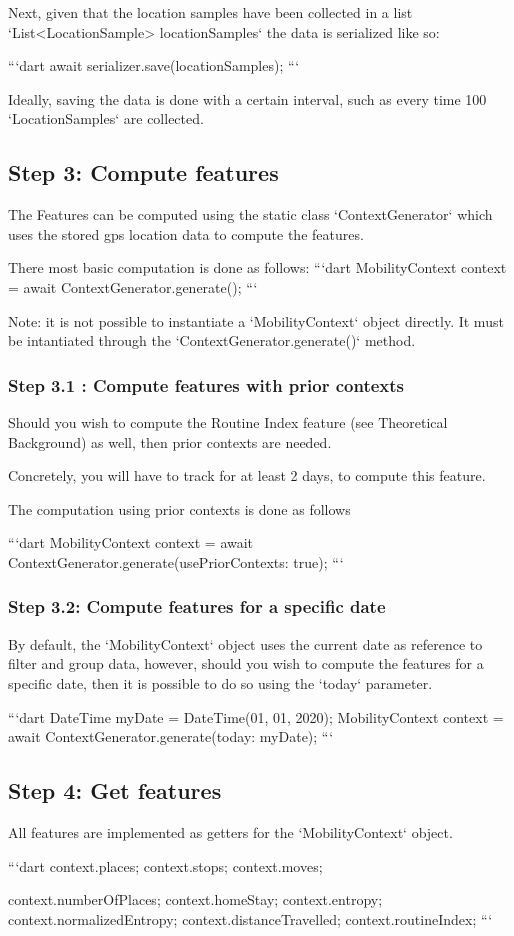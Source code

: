 Next, given that the location samples have been collected in a list `List<LocationSample> locationSamples` the data is serialized like so:

```dart
await serializer.save(locationSamples);
```

Ideally, saving the data is done with a certain interval, such as every time 100 `LocationSamples` are collected. 

\subsection*{Step 3: Compute features}
The Features can be computed using the static class `ContextGenerator` which uses the stored gps location data to compute the features.

There most basic computation is done as follows:
```dart
MobilityContext context = await ContextGenerator.generate();
```

Note: it is not possible to instantiate a `MobilityContext` object directly. 
It must be intantiated through the `ContextGenerator.generate()` method.

\subsubsection*{Step 3.1 : Compute features with prior contexts}
Should you wish to compute the Routine Index feature (see Theoretical Background) as well, then prior contexts are needed. 

Concretely, you will have to track for at least 2 days, to compute this feature.

The computation using prior contexts is done as follows

```dart
MobilityContext context = await ContextGenerator.generate(usePriorContexts: true);
```

\subsubsection*{Step 3.2: Compute features for a specific date}
By default, the `MobilityContext` object uses the current date as reference to filter 
and group data, however, should you wish to compute the features for 
a specific date, then it is possible to do so using the `today` parameter.

```dart
DateTime myDate = DateTime(01, 01, 2020);
MobilityContext context = await ContextGenerator.generate(today: myDate);
```

\subsection*{Step 4: Get features}
All features are implemented as getters for the `MobilityContext` object.

```dart
context.places;
context.stops;
context.moves;

context.numberOfPlaces;
context.homeStay;
context.entropy;
context.normalizedEntropy;
context.distanceTravelled;
context.routineIndex;
```
